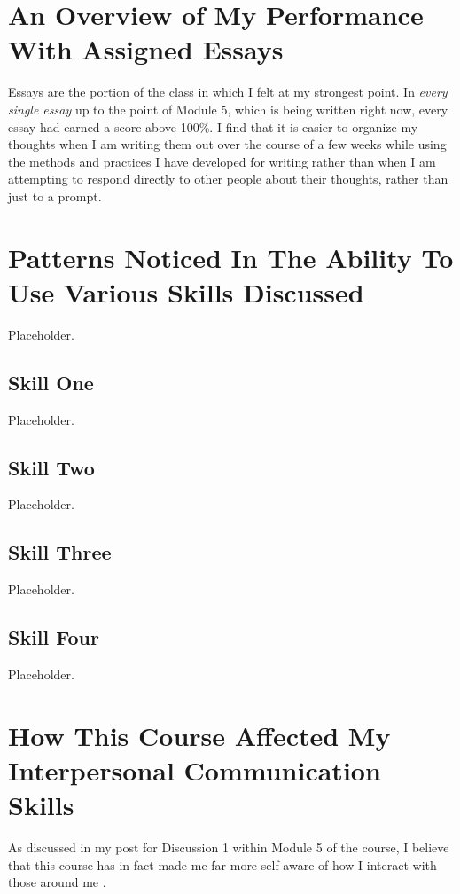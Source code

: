 \section{An Overview of My Performance With Assigned Essays}
  Essays are the portion of the class in which I felt at my strongest point.
    In \textit{every single essay} up to the point of Module 5, which is being
    written right now, every essay had earned a score above 100\%. I find that
    it is easier to organize my thoughts when I am writing them out over the
    course of a few weeks while using the methods and practices I have developed
    for writing rather than when I am attempting to respond directly to
    other people about their thoughts, rather than just to a prompt.


\section{Patterns Noticed In The Ability To Use Various Skills Discussed}
  Placeholder.

  \subsection{Skill One}
    Placeholder.

  \subsection{Skill Two}
    Placeholder.

  \subsection{Skill Three}
    Placeholder.

  \subsection{Skill Four}
    Placeholder.


\section{How This Course Affected My Interpersonal Communication Skills}
  As discussed in my post for Discussion 1 within Module 5 of the course, I
    believe that this course has in fact made me far more self-aware of how I
    interact with those around me \parencite{hellwig_m5d2_2020}.
